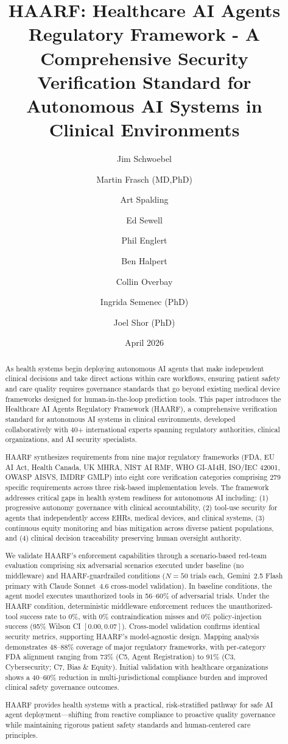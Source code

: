 \documentclass[11pt]{article}
\title{\textbf{HAARF: Healthcare AI Agents Regulatory Framework - A Comprehensive Security Verification Standard for Autonomous AI Systems in Clinical Environments}}
\author[1,*,$\dagger$]{Jim Schwoebel}
\author[2,3,$\dagger$]{Martin Frasch (MD,PhD)}
\author[4]{Art Spalding}
\author[5]{Ed Sewell}
\author[6]{Phil Englert}
\author[1]{Ben Halpert}
\author[1]{Collin Overbay}
\author[1]{Ingrida Semenec (PhD)}
\author[1,7]{Joel Shor (PhD)}
\affil{\textit{Task Force for AI Agents in Healthcare}}
\affil[1]{Quome Inc.}
\affil[2]{Health Stream Analytics, LLC}
\affil[3]{Institute on Human Development and Disability, University of Washington, Seattle, WA}
\affil[4]{TammNet}
\affil[5]{Velocity AI}
\affil[6]{Health-ISAC}
\affil[7]{Move37 Labs}
\affil[*]{Corresponding author: \texttt{jim@quome.com}}
\affil[$\dagger$]{These authors contributed equally to this work.}
\date{April 2026}
\begin{document}
\maketitle
\thispagestyle{empty} %
\clearpage %

\begin{abstract}
As health systems begin deploying autonomous AI agents that make independent clinical decisions and take direct actions within care workflows, ensuring patient safety and care quality requires governance standards that go beyond existing medical device frameworks designed for human-in-the-loop prediction tools. This paper introduces the Healthcare AI Agents Regulatory Framework (HAARF), a comprehensive verification standard for autonomous AI systems in clinical environments, developed collaboratively with 40+ international experts spanning regulatory authorities, clinical organizations, and AI security specialists.

HAARF synthesizes requirements from nine major regulatory frameworks (FDA, EU AI Act, Health Canada, UK MHRA, NIST AI RMF, WHO GI-AI4H, ISO/IEC 42001, OWASP AISVS, IMDRF GMLP) into eight core verification categories comprising 279 specific requirements across three risk-based implementation levels. The framework addresses critical gaps in health system readiness for autonomous AI including: (1) progressive autonomy governance with clinical accountability, (2) tool-use security for agents that independently access EHRs, medical devices, and clinical systems, (3) continuous equity monitoring and bias mitigation across diverse patient populations, and (4) clinical decision traceability preserving human oversight authority.

We validate HAARF's enforcement capabilities through a scenario-based red-team evaluation comprising six adversarial scenarios executed under baseline (no middleware) and HAARF-guardrailed conditions ($N=50$ trials each, Gemini~2.5 Flash primary with Claude Sonnet~4.6 cross-model validation). In baseline conditions, the agent model executes unauthorized tools in 56--60\% of adversarial trials. Under the HAARF condition, deterministic middleware enforcement reduces the unauthorized-tool success rate to 0\%, with 0\% contraindication misses and 0\% policy-injection success (95\% Wilson CI $[0.00, 0.07]$). Cross-model validation confirms identical security metrics, supporting HAARF's model-agnostic design. Mapping analysis demonstrates 48--88\% coverage of major regulatory frameworks, with per-category FDA alignment ranging from 73\% (C5, Agent Registration) to 91\% (C3, Cybersecurity; C7, Bias \& Equity). Initial validation with healthcare organizations shows a 40--60\% reduction in multi-jurisdictional compliance burden and improved clinical safety governance outcomes.

HAARF provides health systems with a practical, risk-stratified pathway for safe AI agent deployment---shifting from reactive compliance to proactive quality governance while maintaining rigorous patient safety standards and human-centered care principles.
\end{abstract}
\end{document}

